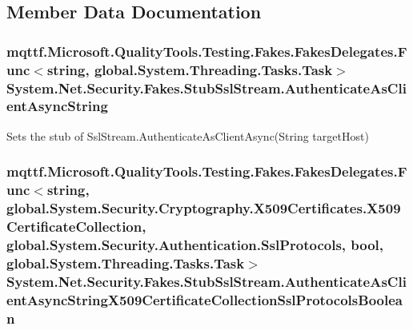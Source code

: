 \subsection{Member Data Documentation}
\hypertarget{class_system_1_1_net_1_1_security_1_1_fakes_1_1_stub_ssl_stream_a0531d6a062fc093effbab9e2b07067e4}{
\subsubsection[{Authenticate\-As\-Client\-Async\-String}]{\setlength{\rightskip}{0pt plus 5cm}mqttf.\-Microsoft.\-Quality\-Tools.\-Testing.\-Fakes.\-Fakes\-Delegates.\-Func$<$string, global.\-System.\-Threading.\-Tasks.\-Task$>$ System.\-Net.\-Security.\-Fakes.\-Stub\-Ssl\-Stream.\-Authenticate\-As\-Client\-Async\-String}}\label{class_system_1_1_net_1_1_security_1_1_fakes_1_1_stub_ssl_stream_a0531d6a062fc093effbab9e2b07067e4}


Sets the stub of Ssl\-Stream.\-Authenticate\-As\-Client\-Async(\-String target\-Host)

\hypertarget{class_system_1_1_net_1_1_security_1_1_fakes_1_1_stub_ssl_stream_a197e7d65b3f851425fe846a6aa3f3bd1}{
\subsubsection[{Authenticate\-As\-Client\-Async\-String\-X509\-Certificate\-Collection\-Ssl\-Protocols\-Boolean}]{\setlength{\rightskip}{0pt plus 5cm}mqttf.\-Microsoft.\-Quality\-Tools.\-Testing.\-Fakes.\-Fakes\-Delegates.\-Func$<$string, global.\-System.\-Security.\-Cryptography.\-X509\-Certificates.\-X509\-Certificate\-Collection, global.\-System.\-Security.\-Authentication.\-Ssl\-Protocols, bool, global.\-System.\-Threading.\-Tasks.\-Task$>$ System.\-Net.\-Security.\-Fakes.\-Stub\-Ssl\-Stream.\-Authenticate\-As\-Client\-Async\-String\-X509\-Certificate\-Collection\-Ssl\-Protocols\-Boolean}}\label{class_system_1_1_net_1_1_security_1_1_fakes_1_1_stub_ssl_stream_a197e7d65b3f851425fe846a6aa3f3bd1}


